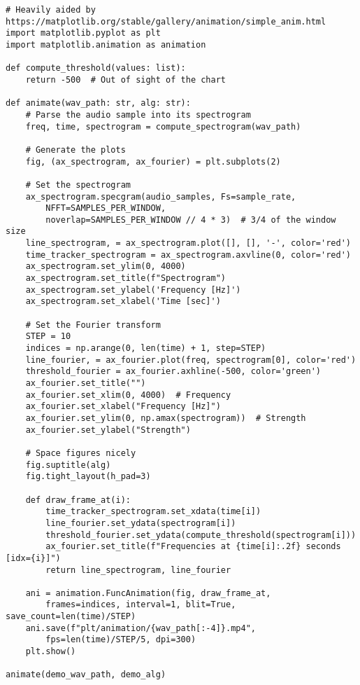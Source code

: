 \begin{verbatim}
# Heavily aided by https://matplotlib.org/stable/gallery/animation/simple_anim.html
import matplotlib.pyplot as plt
import matplotlib.animation as animation

def compute_threshold(values: list):
    return -500  # Out of sight of the chart

def animate(wav_path: str, alg: str):
    # Parse the audio sample into its spectrogram
    freq, time, spectrogram = compute_spectrogram(wav_path)

    # Generate the plots
    fig, (ax_spectrogram, ax_fourier) = plt.subplots(2)

    # Set the spectrogram
    ax_spectrogram.specgram(audio_samples, Fs=sample_rate, 
        NFFT=SAMPLES_PER_WINDOW,
        noverlap=SAMPLES_PER_WINDOW // 4 * 3)  # 3/4 of the window size
    line_spectrogram, = ax_spectrogram.plot([], [], '-', color='red')
    time_tracker_spectrogram = ax_spectrogram.axvline(0, color='red')
    ax_spectrogram.set_ylim(0, 4000)
    ax_spectrogram.set_title(f"Spectrogram")
    ax_spectrogram.set_ylabel('Frequency [Hz]')
    ax_spectrogram.set_xlabel('Time [sec]')

    # Set the Fourier transform
    STEP = 10
    indices = np.arange(0, len(time) + 1, step=STEP)
    line_fourier, = ax_fourier.plot(freq, spectrogram[0], color='red')
    threshold_fourier = ax_fourier.axhline(-500, color='green')
    ax_fourier.set_title("")
    ax_fourier.set_xlim(0, 4000)  # Frequency
    ax_fourier.set_xlabel("Frequency [Hz]")
    ax_fourier.set_ylim(0, np.amax(spectrogram))  # Strength
    ax_fourier.set_ylabel("Strength")

    # Space figures nicely
    fig.suptitle(alg)
    fig.tight_layout(h_pad=3)

    def draw_frame_at(i):
        time_tracker_spectrogram.set_xdata(time[i])
        line_fourier.set_ydata(spectrogram[i])
        threshold_fourier.set_ydata(compute_threshold(spectrogram[i]))
        ax_fourier.set_title(f"Frequencies at {time[i]:.2f} seconds [idx={i}]")
        return line_spectrogram, line_fourier

    ani = animation.FuncAnimation(fig, draw_frame_at,
        frames=indices, interval=1, blit=True, save_count=len(time)/STEP)
    ani.save(f"plt/animation/{wav_path[:-4]}.mp4",
        fps=len(time)/STEP/5, dpi=300)
    plt.show()

animate(demo_wav_path, demo_alg)
\end{verbatim}


